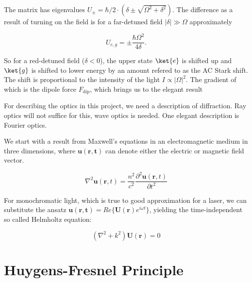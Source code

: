 The matrix has eigenvalues $U_{\pm} = \hbar/2 \cdot (\delta \pm \sqrt{\Omega^2+\delta^2})$. The difference as a result of turning on the field is for a far-detuned field $|\delta| \gg \Omega$ approximately 

\begin{equation}\label{eq:Stark}
	U_{e,g} = \pm \frac{\hbar \Omega^2}{4 \delta}.
\end{equation}

So for a red-detuned field ($\delta < 0$), the upper state $\ket{e}$ is shifted up and $\ket{g}$ is shifted to lower energy by an amount refered to as the AC Stark shift. The shift is proportional to the intensity of the light $I \propto |\Omega|^2$. The gradient of which is the dipole force $F_{\text{dip}}$, which brings us to the elegant result






For describing the optics in this project, we need a description of diffraction. Ray optics will not suffice for this, wave optics is needed. One elegant description is Fourier optics. 

We start with a result from Maxwell's equations in an electromagnetic medium in three dimensions, where $\mathbf{u(\mathbf{r},t)}$ can denote either the electric or magnetic field vector.

\begin{equation}\label{WaveEquation}
	\nabla^2 \mathbf{u}(\mathbf{r},t) = \frac{n^2}{c^2} \frac{\partial^2 \mathbf{u}(\mathbf{r},t)}{\partial t^2}
\end{equation}

For monochromatic light, which is true to good approximation for a laser, we can substitute the ansatz $\mathbf{u(\mathbf{r},t)} = Re\{ \mathbf{U}(\mathbf{r}) e^{i \omega t} \}$, yielding the time-independent so called Helmholtz equation:

\begin{equation}\label{Helmholtz}
	(\nabla^2 + k^2)  \mathbf{U}(\mathbf{r}) = 0
\end{equation}

\section{Huygens-Fresnel Principle}

